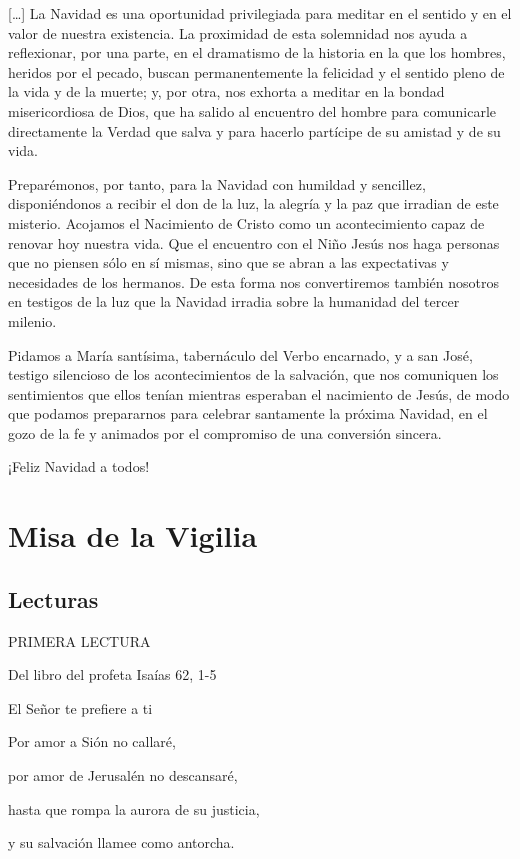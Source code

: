 \begin{body}
\begin{body}
{[}\ldots{}{]} La Navidad es una oportunidad privilegiada para meditar en el sentido y en el valor de nuestra existencia. La proximidad de esta solemnidad nos ayuda a reflexionar, por una parte, en el dramatismo de la historia en la que los hombres, heridos por el pecado, buscan permanentemente la felicidad y el sentido pleno de la vida y de la muerte; y, por otra, nos exhorta a meditar en la bondad misericordiosa de Dios, que ha salido al encuentro del hombre para comunicarle directamente la Verdad que salva y para hacerlo partícipe de su amistad y de su vida.

Preparémonos, por tanto, para la Navidad con humildad y sencillez, disponiéndonos a recibir el don de la luz, la alegría y la paz que irradian de este misterio. Acojamos el Nacimiento de Cristo como un acontecimiento capaz de renovar hoy nuestra vida. Que el encuentro con el Niño Jesús nos haga personas que no piensen sólo en sí mismas, sino que se abran a las expectativas y necesidades de los hermanos. De esta forma nos convertiremos también nosotros en testigos de la luz que la Navidad irradia sobre la humanidad del tercer milenio.

Pidamos a María santísima, tabernáculo del Verbo encarnado, y a san José, testigo silencioso de los acontecimientos de la salvación, que nos comuniquen los sentimientos que ellos tenían mientras esperaban el nacimiento de Jesús, de modo que podamos prepararnos para celebrar santamente la próxima Navidad, en el gozo de la fe y animados por el compromiso de una conversión sincera.

¡Feliz Navidad a todos!

\chapter{Misa de la Vigilia}

\section{Lecturas}

PRIMERA LECTURA

Del libro del profeta Isaías 62, 1-5

El Señor te prefiere a ti

Por amor a Sión no callaré,

por amor de Jerusalén no descansaré,

hasta que rompa la aurora de su justicia,

y su salvación llamee como antorcha.


\end{body}
\end{body}
